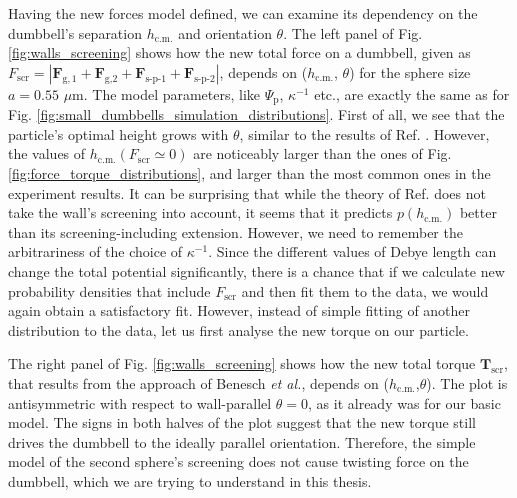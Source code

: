 \documentclass{master_thesis}
\begin{document}
Having the new forces model defined, we can examine its dependency on the dumbbell's separation $h_{\textrm{c.m.}}$ and orientation $\theta$. The left panel of Fig. \ref{fig:walls_screening} shows how the new total force on a dumbbell, given as $F_{\textrm{scr}}=|\boldsymbol{F}_{\textrm{g},1}+\boldsymbol{F}_{\textrm{g,}2}+\boldsymbol{F}_{\textrm{s-p-}1}+\boldsymbol{F}_{\textrm{s-p-}2}|$, depends on ($h_{\textrm{c.m.}}$, $\theta$) for the sphere size $a=0.55$ $\mu$m. The model parameters, like $\Psi_\textrm{p}$, $\kappa^{-1}$ etc., are exactly the same as for Fig. \ref{fig:small_dumbbells_simulation_distributions}. First of all, we see that the particle's optimal height grows with $\theta$, similar to the results of Ref. \cite{verweij2021}. However, the values of $h_{\textrm{c.m.}}(F_{\textrm{scr}}\simeq0)$ are noticeably larger than the ones of Fig. \ref{fig:force_torque_distributions}, and larger than the most common ones in the experiment results. It can be surprising that while the theory of Ref. \cite{verweij2021} does not take the wall's screening into account, it seems that it predicts $p(h_{\textrm{c.m.}})$ better than its screening-including extension. However, we need to remember the arbitrariness of the choice of $\kappa^{-1}$. Since the different values of Debye length can change the total potential significantly, there is a chance that if we calculate new probability densities that include $F_{\textrm{scr}}$ and then fit them to the data, we would again obtain a satisfactory fit. However, instead of simple fitting of another distribution to the data, let us first analyse the new torque on our particle.

The right panel of Fig. \ref{fig:walls_screening} shows how the new total torque $\boldsymbol{T}_{\textrm{scr}}$, that results from the approach of Benesch \textit{et al.}, depends on ($h_{\textrm{c.m.}}$,$\theta$). The plot is antisymmetric with respect to wall-parallel $\theta=0$, as it already was for our basic model. The signs in both halves of the plot suggest that the new torque still drives the dumbbell to the ideally parallel orientation. Therefore, the simple model of the second sphere's screening does not cause twisting force on the dumbbell, which we are trying to understand in this thesis.
\end{document}
